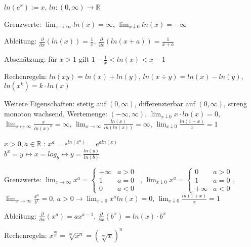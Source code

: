 \documentclass[]{article}
\begin{document}
\begin{definition}[Logarithmusfunktion]
	$ln(e^x) := x$, $ln : (0, \infty) \rightarrow \mathbb{R}$
	
	\begin{description} [noitemsep]
		\item Grenzwerte: $\lim_{x \rightarrow \infty} ln (x) = \infty$, $\lim_{x \downarrow 0} ln (x )= - \infty$
		\item Ableitung: $\frac{\partial}{\partial x} (ln(x)) = \frac{1}{x}$, $\frac{\partial}{\partial x} (ln(x + a)) = \frac{1}{x + a}$
		\item Abschätzung: für $x > 1$ gilt $1 - \frac{1}{x} < ln(x) < x - 1$
		\item Rechenregeln: $ln(xy) = ln(x) + ln(y)$, $ln(x \div y) = ln(x) - ln(y)$, $ln(x^k) = k \cdot ln(x)$
		\item Weitere Eigenschaften: stetig auf $(0,\infty)$, differenzierbar auf $(0,\infty)$, streng monoton wachsend, Wertemenge: $(- \infty, \infty)$, $\lim_{x \downarrow 0} x \cdot ln(x) = 0$, $\lim_{x \mapsto \infty} \frac{x}{ln(x)^n} = \infty$,  $\lim_{x \rightarrow \infty} \frac{ln(x)}{ln(ln(x))} = \infty$,  $\lim_{x \downarrow 0} \frac{ln(1+x)}{x} = 1$
	\end{description}
\end{definition}

\begin{definition}
 $\medspace$	\\ $x > 0, a \in \mathbb{R}$ : $x^a = e^{ln(x^a)} = e^{a ln(x)}$ \\ $b^x = y \leftrightarrow x = log_b \leftrightarrow y = \frac{ln (y)}{ln(b)}$
	\begin{description} [noitemsep]
		\item Grenzwerte: $\lim_{x \rightarrow \infty} x^a = \begin{cases}
		+ \infty & a > 0 \\ 
		1        & a = 0  \\
		0        & a < 0
		\end{cases} \medspace \medspace $,
		$\lim_{x \downarrow 0} x^a = \begin{cases}
		0        & a > 0 \\ 
		1        & a = 0  \\
		+ \infty & a < 0
		\end{cases}$,\\
		 $\lim_{x \rightarrow \infty} \frac{x^a}{b^x} = 0$, $a > 0 \rightarrow \lim_{x \downarrow 0} x^a ln(x) = 0$, $\lim_{x \downarrow 0} \frac{ln(1+x)}{x} = 1$
		\item Ableitung: $\frac{\partial}{\partial x} (x^a) = a x^{a - 1}$, $\frac{\partial}{\partial x}(b^x) = ln(x) \cdot b^x$
		\item Rechenregeln: $x^{\frac{m}{n}} = \sqrt[m]{x^n} = (\sqrt[m]{x})^n$
	\end{description}
\end{definition}
\end{document}
